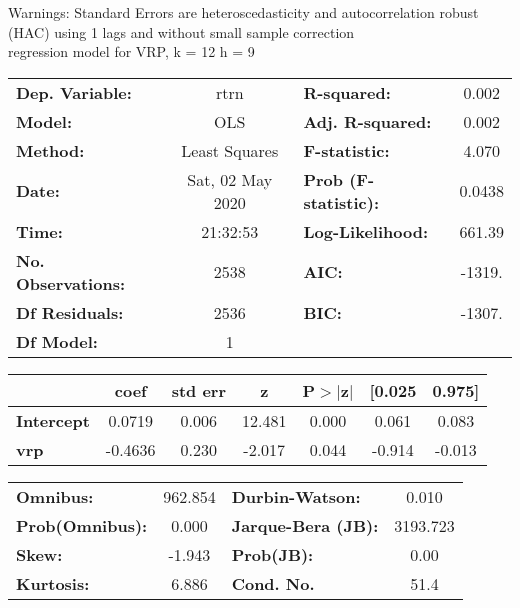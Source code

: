 Warnings: \newline
 [1] Standard Errors are heteroscedasticity and autocorrelation robust (HAC) using 1 lags and without small sample correction\\ 

regression model for VRP, k = 12 h = 9\begin{center}
\begin{tabular}{lclc}
\toprule
\textbf{Dep. Variable:}    &       rtrn       & \textbf{  R-squared:         } &     0.002   \\
\textbf{Model:}            &       OLS        & \textbf{  Adj. R-squared:    } &     0.002   \\
\textbf{Method:}           &  Least Squares   & \textbf{  F-statistic:       } &     4.070   \\
\textbf{Date:}             & Sat, 02 May 2020 & \textbf{  Prob (F-statistic):} &   0.0438    \\
\textbf{Time:}             &     21:32:53     & \textbf{  Log-Likelihood:    } &    661.39   \\
\textbf{No. Observations:} &        2538      & \textbf{  AIC:               } &    -1319.   \\
\textbf{Df Residuals:}     &        2536      & \textbf{  BIC:               } &    -1307.   \\
\textbf{Df Model:}         &           1      & \textbf{                     } &             \\
\bottomrule
\end{tabular}
\begin{tabular}{lcccccc}
                   & \textbf{coef} & \textbf{std err} & \textbf{z} & \textbf{P$> |$z$|$} & \textbf{[0.025} & \textbf{0.975]}  \\
\midrule
\textbf{Intercept} &       0.0719  &        0.006     &    12.481  &         0.000        &        0.061    &        0.083     \\
\textbf{vrp}       &      -0.4636  &        0.230     &    -2.017  &         0.044        &       -0.914    &       -0.013     \\
\bottomrule
\end{tabular}
\begin{tabular}{lclc}
\textbf{Omnibus:}       & 962.854 & \textbf{  Durbin-Watson:     } &    0.010  \\
\textbf{Prob(Omnibus):} &   0.000 & \textbf{  Jarque-Bera (JB):  } & 3193.723  \\
\textbf{Skew:}          &  -1.943 & \textbf{  Prob(JB):          } &     0.00  \\
\textbf{Kurtosis:}      &   6.886 & \textbf{  Cond. No.          } &     51.4  \\
\bottomrule
\end{tabular}
\end{center}

